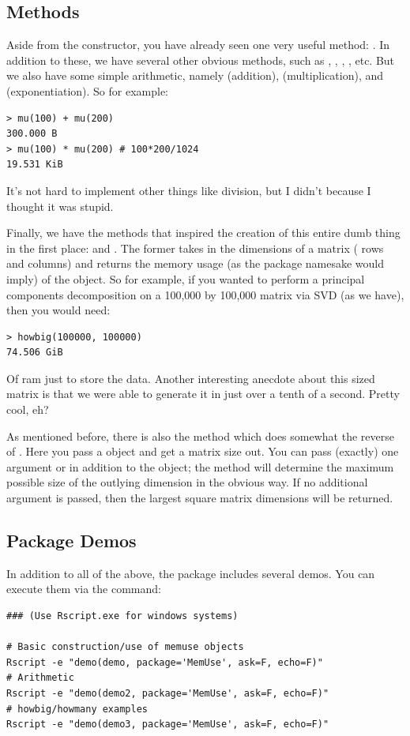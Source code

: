 \subsection{Methods}
Aside from the constructor, you have already seen one very useful method:  .  In addition to these, we have several other obvious methods, such as , , , , etc.  But we also have some simple arithmetic, namely  (addition),  (multiplication), and  (exponentiation).  So for example:
\begin{lstlisting}[language=rr]
> mu(100) + mu(200)
300.000 B
> mu(100) * mu(200) # 100*200/1024
19.531 KiB
\end{lstlisting}
It's not hard to implement other things like division, but I didn't because I thought it was stupid.

Finally, we have the methods that inspired the creation of this entire dumb thing in the first place:   and .  The former takes in the dimensions of a matrix ( rows and  columns) and returns the memory usage (as the package namesake would imply) of the object.  So for example, if you wanted to perform a principal components decomposition on a 100,000 by 100,000 matrix via SVD (as we have), then you would need:
\begin{lstlisting}
> howbig(100000, 100000)
74.506 GiB
\end{lstlisting}
Of ram just to store the data.  Another interesting anecdote about this sized matrix is that we were able to generate it in just over a tenth of a second.  Pretty cool, eh?

As mentioned before, there is also the  method which does somewhat the reverse of .  Here you pass a  object and get a matrix size out.  You can pass (exactly) one argument  or  in addition to the  object; the method will determine the maximum possible size of the outlying dimension in the obvious way.  If no additional argument is passed, then the largest square matrix dimensions will be returned.



\subsection{Package Demos}

In addition to all of the above, the  package includes several demos.  You can execute them via the command:
\begin{lstlisting}[title=List of Demos]
### (Use Rscript.exe for windows systems)

# Basic construction/use of memuse objects
Rscript -e "demo(demo, package='MemUse', ask=F, echo=F)"
# Arithmetic
Rscript -e "demo(demo2, package='MemUse', ask=F, echo=F)"
# howbig/howmany examples
Rscript -e "demo(demo3, package='MemUse', ask=F, echo=F)"
\end{lstlisting}